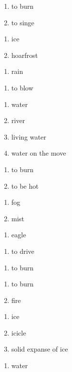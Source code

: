 \begin{enumerate}
\item to burn
\item to singe
\end{enumerate}
\begin{enumerate}
\item ice
\item hoarfrost
\end{enumerate}
\begin{enumerate}
\item rain
\end{enumerate}
\begin{enumerate}
\item to blow
\end{enumerate}
\begin{enumerate}
\item water
\item river
\item living water
\item water on the move
\end{enumerate}
\begin{enumerate}
\item to burn
\item to be hot
\end{enumerate}
\begin{enumerate}
\item fog
\item mist
\end{enumerate}
\begin{enumerate}
\item eagle
\end{enumerate}
\begin{enumerate}
\item to drive
\end{enumerate}
\begin{enumerate}
\item to burn
\end{enumerate}
\begin{enumerate}
\item to burn
\item fire
\end{enumerate}
\begin{enumerate}
\item ice
\item icicle
\item solid expanse of ice
\end{enumerate}
\begin{enumerate}
\item water
\end{enumerate}
